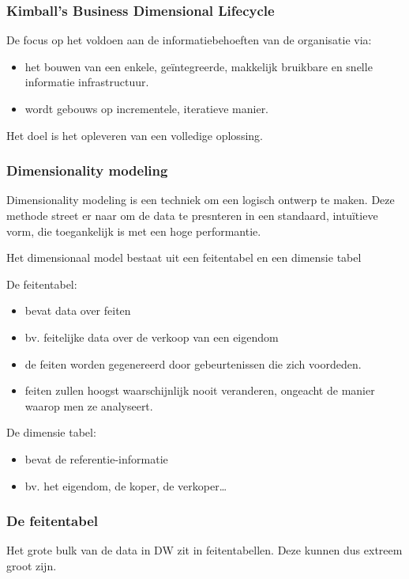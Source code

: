 \documentclass[a4paper,12pt]{article}
\begin{document}
\subsubsection{Kimball's Business Dimensional Lifecycle}
De focus op het voldoen aan de informatiebehoeften van de organisatie via:
\begin{itemize}
\item het bouwen van een enkele, geïntegreerde, makkelijk bruikbare en snelle informatie infrastructuur.
\item wordt gebouws op incrementele, iteratieve manier.
\end{itemize}

Het doel is het opleveren van een volledige oplossing.

\subsubsection{Dimensionality modeling}
Dimensionality modeling is een techniek om een logisch ontwerp te maken.
Deze methode street er naar om de data te presnteren in een standaard, intuïtieve vorm, die toegankelijk is met een hoge performantie.

Het dimensionaal model bestaat uit een feitentabel en een dimensie tabel

De feitentabel:
\begin{itemize}
\item bevat data over feiten
\item bv. feitelijke data over de verkoop van een eigendom
\item de feiten worden gegenereerd door gebeurtenissen die zich voordeden.
\item feiten zullen hoogst waarschijnlijk nooit veranderen, ongeacht de manier waarop men ze analyseert.
\end{itemize}

De dimensie tabel:
\begin{itemize}
\item bevat de referentie-informatie
\item bv. het eigendom, de koper, de verkoper\ldots
\end{itemize}

\subsubsection{De feitentabel}
Het grote bulk van de data in DW zit in feitentabellen.
Deze kunnen dus extreem groot zijn.
\end{document}
